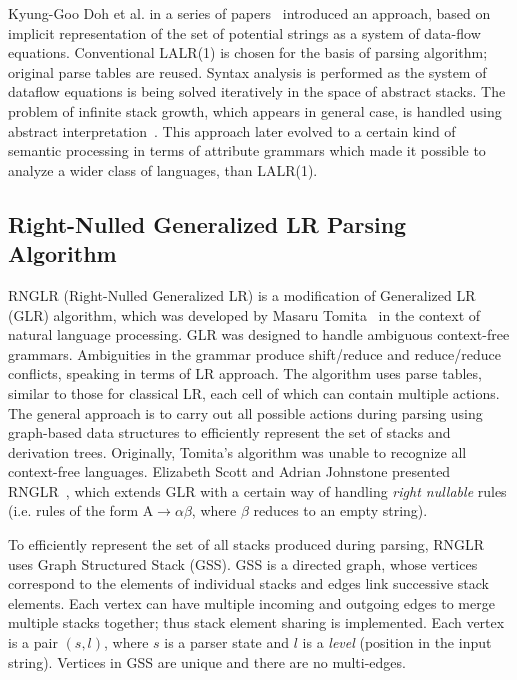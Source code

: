 Kyung-Goo Doh et al. in a series of papers~\cite{AbstrParsing,LRAbstrParsing,LRAbstrParsingSema} introduced an
approach, based on implicit representation of the set of potential strings as a system of data-flow equations. 
Conventional LALR(1) is chosen for the basis of parsing algorithm; original parse tables are reused. 
Syntax analysis is performed as the system of dataflow equations is being solved iteratively in the space of abstract stacks.
The problem of infinite stack growth, which appears in general case, is handled using abstract 
interpretation~\cite{AbstractInterpretation}. This approach later evolved to a certain kind of semantic processing
in terms of attribute grammars which made it possible to analyze a wider class of languages, than
LALR(1).

\subsection{Right-Nulled Generalized LR Parsing Algorithm}
RNGLR (Right-Nulled Generalized LR) is a modification of Generalized LR (GLR) algorithm, which
was developed by Masaru Tomita~\cite{Tomita} in the context of natural language processing. 
GLR was designed to handle ambiguous context-free grammars. Ambiguities in the grammar produce 
shift/reduce and reduce/reduce conflicts, speaking in terms of LR approach. The algorithm 
uses parse tables, similar to those for classical LR, each cell of which can contain multiple 
actions. The general approach is to carry out all possible actions during parsing 
using graph-based data structures to efficiently represent the set of stacks 
and derivation trees. Originally, Tomita's algorithm was unable to recognize all context-free languages.  
Elizabeth Scott and Adrian Johnstone presented RNGLR~\cite{RNGLR},
which extends GLR with a certain way of handling \emph{right nullable} 
rules (i.e. rules of the form $\mathrm{A} \rightarrow \alpha \beta$, where $\beta$ 
reduces to an empty string).

To efficiently represent the set of all stacks produced during parsing,
RNGLR uses Graph Structured Stack (GSS). GSS is a directed graph,
whose vertices correspond to the elements of individual stacks and edges link successive
stack elements. Each vertex can have multiple incoming and outgoing edges to merge 
multiple stacks together; thus stack element sharing is implemented. Each vertex is 
a pair $(s,l)$, where $s$ is a parser state and $l$ is a \emph{level} (position in the input string). 
Vertices in GSS are unique and there are no multi-edges. 

